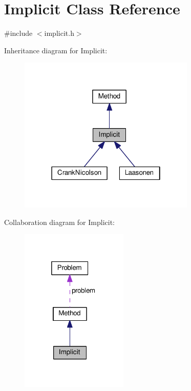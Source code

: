 \hypertarget{classImplicit}{}\section{Implicit Class Reference}
\label{classImplicit}


{\ttfamily \#include $<$implicit.\+h$>$}



Inheritance diagram for Implicit\+:
\nopagebreak
\begin{figure}[H]
\begin{center}
\leavevmode
\includegraphics[width=238pt]{classImplicit__inherit__graph}
\end{center}
\end{figure}


Collaboration diagram for Implicit\+:
\nopagebreak
\begin{figure}[H]
\begin{center}
\leavevmode
\includegraphics[width=145pt]{classImplicit__coll__graph}
\end{center}
\end{figure}
